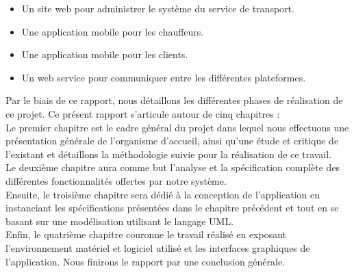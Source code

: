 {\begin{itemize}
\item Un site web pour administrer le système du service de transport.
\item Une application mobile pour les chauffeurs.
\item Une application mobile  pour les clients.
\item Un web service pour communiquer entre les différentes plateformes.\\
\end{itemize}

 
Par le biais de ce rapport, nous détaillons les différentes phases de réalisation de ce projet. Ce présent rapport s'articule autour de cinq chapitres :\\

Le premier chapitre est le cadre général du projet  dans lequel nous effectuons une présentation générale de l'organisme d'accueil, ainsi qu'une étude et critique de l'existant et détaillons la méthodologie suivie pour la réalisation de ce travail.\\

Le deuxième chapitre aura comme but l'analyse et la spécification complète des différentes fonctionnalités offertes par notre système. \\

Ensuite, le troisième chapitre sera dédié à la conception de l'application en instanciant les spécifications présentées dans le chapitre précédent et tout en se basant sur une modélisation utilisant le langage UML.\\

Enfin, le quatrième chapitre couronne le travail réalisé en exposant l'environnement matériel et logiciel utilisé et les interfaces graphiques de l'application.
 Nous finirons le rapport par une conclusion générale.
}
\newpage